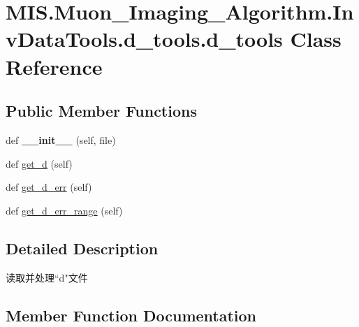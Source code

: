 \hypertarget{classMIS_1_1Muon__Imaging__Algorithm_1_1InvDataTools_1_1d__tools_1_1d__tools}{}\section{M\+I\+S.\+Muon\+\_\+\+Imaging\+\_\+\+Algorithm.\+Inv\+Data\+Tools.\+d\+\_\+tools.\+d\+\_\+tools Class Reference}
\label{classMIS_1_1Muon__Imaging__Algorithm_1_1InvDataTools_1_1d__tools_1_1d__tools}
\subsection*{Public Member Functions}
\begin{DoxyCompactItemize}
\item 
\mbox{\label{classMIS_1_1Muon__Imaging__Algorithm_1_1InvDataTools_1_1d__tools_1_1d__tools_a4c75688cb7cfff06bdb7e9ccf287f2a5}} 
def {\bfseries \+\_\+\+\_\+init\+\_\+\+\_\+} (self, file)
\item 
def \hyperlink{classMIS_1_1Muon__Imaging__Algorithm_1_1InvDataTools_1_1d__tools_1_1d__tools_a684de1ba9d65d3005c45b17976fa754a}{get\+\_\+d} (self)
\item 
def \hyperlink{classMIS_1_1Muon__Imaging__Algorithm_1_1InvDataTools_1_1d__tools_1_1d__tools_a2bd561186b27757d4b3bbaf70fe0a8e6}{get\+\_\+d\+\_\+err} (self)
\item 
def \hyperlink{classMIS_1_1Muon__Imaging__Algorithm_1_1InvDataTools_1_1d__tools_1_1d__tools_ab2d6c386d4985bc08fa60a1fe445a2cf}{get\+\_\+d\+\_\+err\+\_\+range} (self)
\end{DoxyCompactItemize}


\subsection{Detailed Description}
\begin{DoxyVerb}读取并处理“d"文件\end{DoxyVerb}
 

\subsection{Member Function Documentation}
\mbox{\label{classMIS_1_1Muon__Imaging__Algorithm_1_1InvDataTools_1_1d__tools_1_1d__tools_a684de1ba9d65d3005c45b17976fa754a}} 
